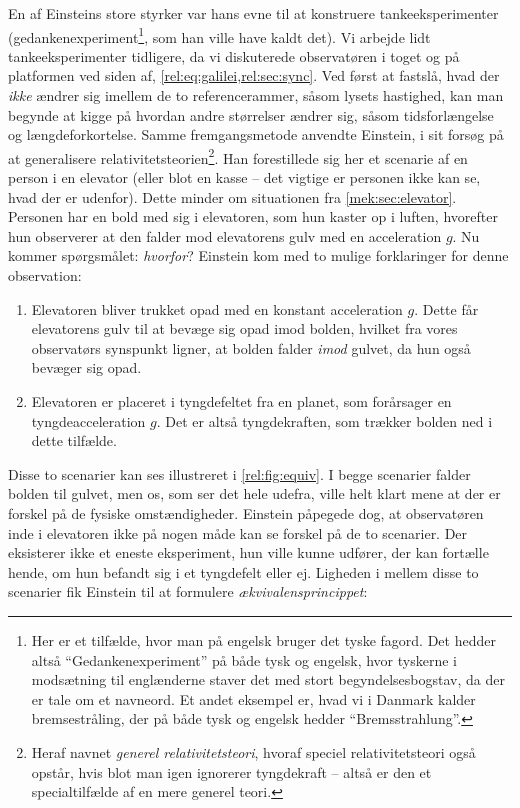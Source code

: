 \documentclass[crop=false, class=memoir]{standalone}
\begin{document}
En af Einsteins store styrker var hans evne til at konstruere tankeeksperimenter (gedankenexperiment\footnote{Her er et tilfælde, hvor man på engelsk bruger det tyske fagord. Det hedder altså ``Gedankenexperiment'' på både tysk og engelsk, hvor tyskerne i modsætning til englænderne staver det med stort begyndelsesbogstav, da der er tale om et navneord. Et andet eksempel er, hvad vi i Danmark kalder bremsestråling, der på både tysk og engelsk hedder ``Bremsstrahlung''.}, som han ville have kaldt det). Vi arbejde lidt tankeeksperimenter tidligere, da vi diskuterede observatøren i toget og på platformen ved siden af, \cref{rel:eq:galilei,rel:sec:sync}. Ved først at fastslå, hvad der \emph{ikke} ændrer sig imellem de to referencerammer, såsom lysets hastighed, kan man begynde at kigge på hvordan andre størrelser ændrer sig, såsom tidsforlængelse og længdeforkortelse. Samme fremgangsmetode anvendte Einstein, i sit forsøg på at generalisere relativitetsteorien\footnote{Heraf navnet \emph{generel relativitetsteori}, hvoraf speciel relativitetsteori også opstår, hvis blot man igen ignorerer tyngdekraft -- altså er den et specialtilfælde af en mere generel teori.}. Han forestillede sig her et scenarie af en person i en elevator (eller blot en kasse -- det vigtige er personen ikke kan se, hvad der er udenfor). Dette minder om situationen fra \cref{mek:sec:elevator}. Personen har en bold med sig i elevatoren, som hun kaster op i luften, hvorefter hun observerer at den falder mod elevatorens gulv med en acceleration $g$. Nu kommer spørgsmålet: \emph{hvorfor}?
%
Einstein kom med to mulige forklaringer for denne observation:
%
\begin{enumerate}
    \item Elevatoren bliver trukket opad med en konstant acceleration $g$. Dette får elevatorens gulv til at bevæge sig opad imod bolden, hvilket fra vores observatørs synspunkt ligner, at bolden falder \emph{imod} gulvet, da hun også bevæger sig opad.
    \item Elevatoren er placeret i tyngdefeltet fra en planet, som forårsager en tyngdeacceleration $g$. Det er altså tyngdekraften, som trækker bolden ned i dette tilfælde.
\end{enumerate}
%
Disse to scenarier kan ses illustreret i \cref{rel:fig:equiv}.
%
I begge scenarier falder bolden til gulvet, men os, som ser det hele udefra, ville helt klart mene at der er forskel på de fysiske omstændigheder. Einstein påpegede dog, at observatøren inde i elevatoren ikke på nogen måde kan se forskel på de to scenarier. Der eksisterer ikke et eneste eksperiment, hun ville kunne udfører, der kan fortælle hende, om hun befandt sig i et tyngdefelt eller ej. Ligheden i mellem disse to scenarier fik Einstein til at formulere \emph{ækvivalensprincippet}:
\end{document}
